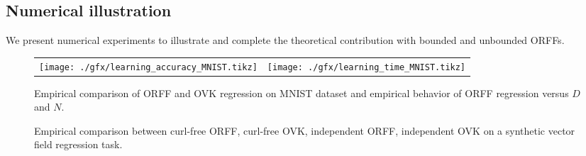 \documentclass[twocolumn]{article}
\begin{document}
\subsection{Numerical illustration}
We present numerical experiments to illustrate and complete the theoretical
contribution with bounded and unbounded ORFFs. 
\begin{figure*}[htb]
    \centering
    \begin{tabular}{cc}
        \texttt{[image: ./gfx/learning\_accuracy\_MNIST.tikz]}
        &
        \texttt{[image: ./gfx/learning\_time\_MNIST.tikz]}
    \end{tabular}
    \caption[Prediction Error in percent on the MNIST dataset versus $D$, the
    number of Fourier features]{Empirical comparison of ORFF and OVK regression
    on MNIST dataset and empirical behavior of ORFF regression versus $D$ and
    $N$. \label{fig:learning_accuracy}}
\end{figure*}
\begin{figure*}[htb]
    \centering
    \resizebox{\textwidth}{!}{%
    
    }
    \caption{Empirical comparison between curl-free ORFF, curl-free OVK,
    independent ORFF, independent OVK on a synthetic vector field regression
    task. \label{fig:curl_experiment}}%
\end{figure*}
\end{document}
